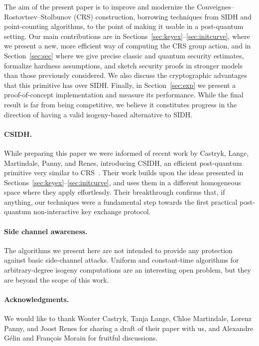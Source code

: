 \documentclass{llncs}
\begin{document}
The aim of the present paper is to improve and modernize the
Couveignes--Rostovtsev--Stolbunov (CRS) construction, borrowing
techniques from SIDH and point-counting algorithms, to the point of
making it usable in a post-quantum setting.  Our main contributions
are in Sections~\ref{sec:keyex}--\ref{sec:initcurve}, where we present
a new, more efficient way of computing the CRS group action, and in
Section~\ref{sec:sec} where we give precise classic and quantum
security estimates, formalize hardness assumptions, and sketch
security proofs in stronger models than those previously
considered. We also discuss the cryptographic advantages
that this primitive has over SIDH.
Finally, in Section~\ref{sec:exp} we present a
proof-of-concept implementation and measure its performance.
While the final result is far from being competitive, we believe it
constitutes progress in the direction of having a valid isogeny-based
alternative to SIDH.

\paragraph{CSIDH.}
While preparing this paper we were informed of
recent work by Castryk, Lange, Martindale, Panny, and Renes,
introducing CSIDH, 
an efficient post-quantum primitive very similar to CRS~\cite{csidh}.
Their work builds upon the ideas presented in
Sections~\ref{sec:keyex}--\ref{sec:initcurve}, and uses them in a
different homogeneous space where they apply effortlessly.  Their
breakthrough confirms that, if anything, our techniques were a
fundamental step towards the first practical post-quantum
non-interactive key exchange protocol.

\paragraph{Side channel awareness.}
The algorithms we present here are not intended to provide any protection
against basic side-channel attacks.  
Uniform and constant-time algorithms for arbitrary-degree isogeny computations
are an interesting open problem,
but they are beyond the scope of this work.

\paragraph{Acknowledgments.}
We would like to thank Wouter Castryk, Tanja Lange, Chloe Martindale,
Lorenz Panny, and Joost Renes for sharing a draft of their paper with
us, and Alexandre Gélin and François Morain for fruitful discussions.
\end{document}
